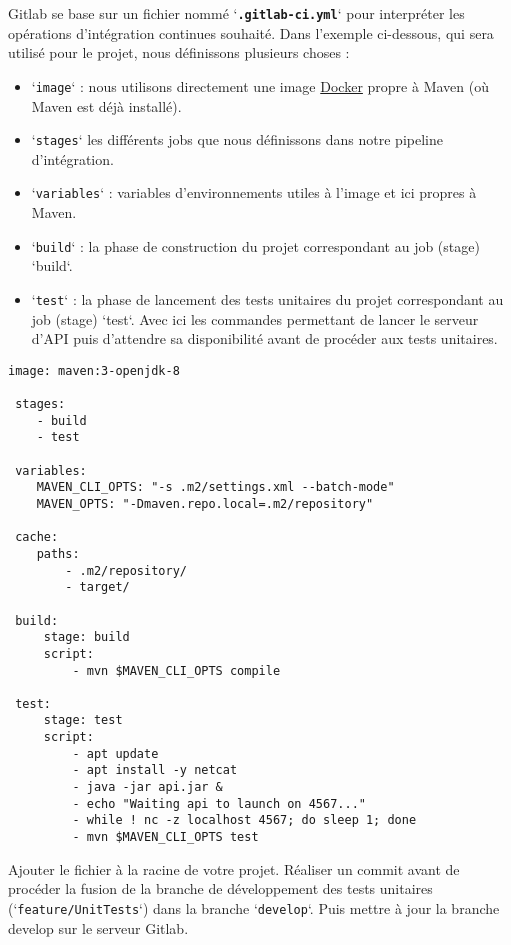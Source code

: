 \documentclass[11pt,a4paper,oneside]{article}
\begin{document}
\vspace{5mm}
Gitlab se base sur un fichier nommé `\textbf{\texttt{.gitlab-ci.yml}}` pour interpréter les opérations d'intégration continues souhaité. Dans l'exemple ci-dessous, qui sera utilisé pour le projet, nous définissons plusieurs choses :

\begin{itemize}
	\item `\texttt{image}` : nous utilisons directement une image \href{https://www.docker.com/}{Docker} propre à Maven (où Maven est déjà installé).
	\item `\texttt{stages}` les différents jobs que nous définissons dans notre pipeline d'intégration.
	\item `\texttt{variables}` : variables d'environnements utiles à l'image et ici propres à Maven.
	\item `\texttt{build}` : la phase de construction du projet correspondant au job (stage) `build`.
	\item `\texttt{test}` : la phase de lancement des tests unitaires du projet correspondant au job (stage) `test`. Avec ici les commandes permettant de lancer le serveur d'API puis d'attendre sa disponibilité avant de procéder aux tests unitaires.
\end{itemize}

\vspace{2mm}
\begin{lstlisting}[style=customYML]
 image: maven:3-openjdk-8

 stages:
 	- build
 	- test

 variables:
 	MAVEN_CLI_OPTS: "-s .m2/settings.xml --batch-mode"
 	MAVEN_OPTS: "-Dmaven.repo.local=.m2/repository"

 cache:
 	paths:
 		- .m2/repository/
 		- target/

 build:
	 stage: build
	 script:
		 - mvn $MAVEN_CLI_OPTS compile

 test:
	 stage: test
	 script:
		 - apt update
		 - apt install -y netcat
	     - java -jar api.jar &
	     - echo "Waiting api to launch on 4567..."
	     - while ! nc -z localhost 4567; do sleep 1; done
	     - mvn $MAVEN_CLI_OPTS test
\end{lstlisting}


\vspace{5mm}

Ajouter le fichier à la racine de votre projet. Réaliser un commit avant de procéder la fusion de la branche de développement des tests unitaires (`\texttt{feature/UnitTests}`) dans la branche `\texttt{develop}`. Puis mettre à jour la branche develop sur le serveur Gitlab.
\end{document}
